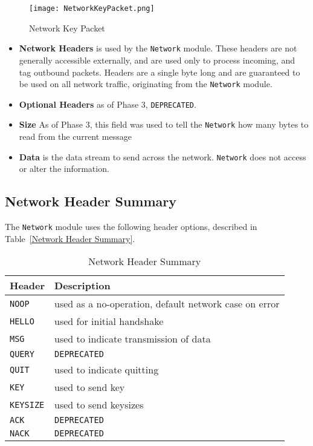 \documentclass[sigconf]{acmart}
\begin{document}
\begin{figure} [htb]
	\centering
	\texttt{[image: NetworkKeyPacket.png]}
	\caption{Network Key Packet}
	\label{Network Key Packet}
\end{figure}

\begin{itemize}
	\item \textbf{Network Headers} is used by the \texttt{Network} module.
	      These headers are not generally accessible externally, and are used
	      only to process incoming, and tag outbound packets. Headers are a
	      single byte long and are guaranteed to be used on all
	      network traffic, originating from the \texttt{Network} module.
	\item \textbf{Optional Headers} as of Phase 3, \texttt{DEPRECATED}.
	\item \textbf{Size} As of Phase 3, this field was used to tell the
	      \texttt{Network} how many bytes to read from the current message
	\item \textbf{Data} is the data stream to send across the network.
	      \texttt{Network} does not access or alter the information.
\end{itemize}

\subsection{Network Header Summary}
The \texttt{Network} module uses the following header options, described in Table~\ref{Network
Header Summary}.
\begin{table}[htb]
	\centering
	\caption{Network Header Summary}
	\label{Network Header Summary}

	\begin{tabular}{|p{4em}|p{20em}|} \hline
		\textbf{Header}  & \textbf{Description} \\ \hline
		\texttt{NOOP}    &
		used as a no-operation, default network case on error \\ \hline
		\texttt{HELLO}   &
		used for initial handshake                            \\ \hline
		\texttt{MSG}     &
		used to indicate transmission of data                 \\ \hline
		\texttt{QUERY}   &
		\texttt{DEPRECATED}                                   \\ \hline
		\texttt{QUIT}    &
		used to indicate quitting                             \\ \hline
		\texttt{KEY}     &
		used to send key                                      \\ \hline
		\texttt{KEYSIZE} &
		used to send keysizes                                 \\ \hline
		\texttt{ACK}     &
		\texttt{DEPRECATED}                                   \\ \hline
		\texttt{NACK}    &
		\texttt{DEPRECATED}                                   \\ \hline
	\end{tabular}
\end{table}
\newline
\end{document}
